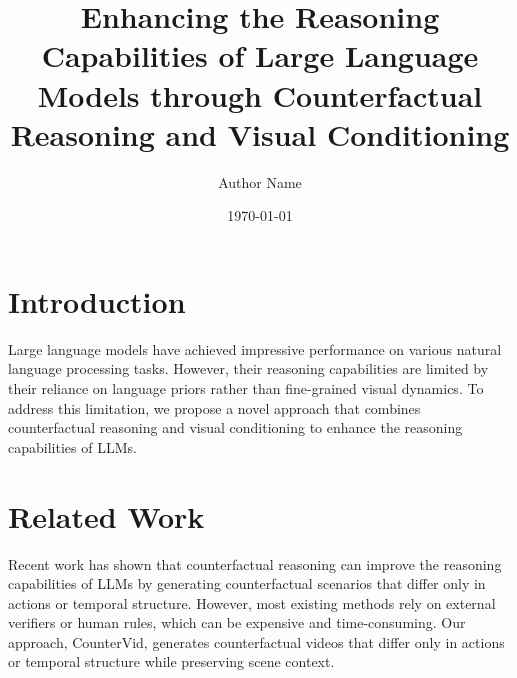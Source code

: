 \documentclass{article}
\begin{document}
\title{Enhancing the Reasoning Capabilities of Large Language Models through Counterfactual Reasoning and Visual Conditioning}

\author{Author Name}


\date{\today}

\maketitle


\section{Introduction}

Large language models have achieved impressive performance on various natural language processing tasks. However, their reasoning capabilities are limited by their reliance on language priors rather than fine-grained visual dynamics. To address this limitation, we propose a novel approach that combines counterfactual reasoning and visual conditioning to enhance the reasoning capabilities of LLMs.

\section{Related Work}

Recent work has shown that counterfactual reasoning can improve the reasoning capabilities of LLMs by generating counterfactual scenarios that differ only in actions or temporal structure. However, most existing methods rely on external verifiers or human rules, which can be expensive and time-consuming. Our approach, CounterVid, generates counterfactual videos that differ only in actions or temporal structure while preserving scene context.
\end{document}
